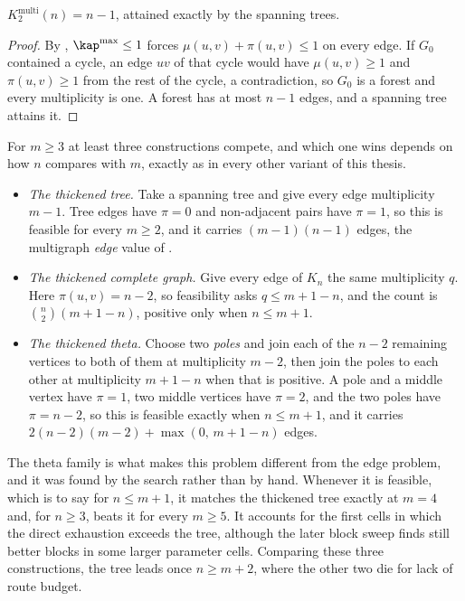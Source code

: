 \begin{theorem}[The other convention at $m = 2$]\label{thm:multi-vertex-m2}
$K_2^{\mathrm{multi}}(n) = n-1$, attained exactly by the spanning trees.
\end{theorem}

\begin{proof}
By , $\kap^{\max} \le 1$ forces $\mu(u,v) + \pi(u,v) \le 1$ on every edge. If $G_0$ contained a cycle, an edge $uv$ of that cycle would have $\mu(u,v) \ge 1$ and $\pi(u,v) \ge 1$ from the rest of the cycle, a contradiction, so $G_0$ is a forest and every multiplicity is one. A forest has at most $n-1$ edges, and a spanning tree attains it.
\end{proof}

For $m \ge 3$ at least three constructions compete, and which one wins depends on how $n$ compares with $m$, exactly as in every other variant of this thesis.

\begin{itemize}
    \item \emph{The thickened tree.} Take a spanning tree and give every edge multiplicity $m-1$. Tree edges have $\pi = 0$ and non-adjacent pairs have $\pi = 1$, so this is feasible for every $m \ge 2$, and it carries $(m-1)(n-1)$ edges, the multigraph \emph{edge} value of .
    \item \emph{The thickened complete graph.} Give every edge of $K_n$ the same multiplicity $q$. Here $\pi(u,v) = n-2$, so feasibility asks $q \le m+1-n$, and the count is $\binom{n}{2}(m+1-n)$, positive only when $n \le m+1$.
    \item \emph{The thickened theta.} Choose two \emph{poles} and join each of the $n-2$ remaining vertices to both of them at multiplicity $m-2$, then join the poles to each other at multiplicity $m+1-n$ when that is positive. A pole and a middle vertex have $\pi = 1$, two middle vertices have $\pi = 2$, and the two poles have $\pi = n-2$, so this is feasible exactly when $n \le m+1$, and it carries $2(n-2)(m-2) + \max(0,\, m+1-n)$ edges.
\end{itemize}

The theta family is what makes this problem different from the edge problem, and it was found by the search rather than by hand. Whenever it is feasible, which is to say for $n \le m+1$, it matches the thickened tree exactly at $m = 4$ and, for $n\ge3$, beats it for every $m \ge 5$. It accounts for the first cells in which the direct exhaustion exceeds the tree, although the later block sweep finds still better blocks in some larger parameter cells. Comparing these three constructions, the tree leads once $n \ge m+2$, where the other two die for lack of route budget.

